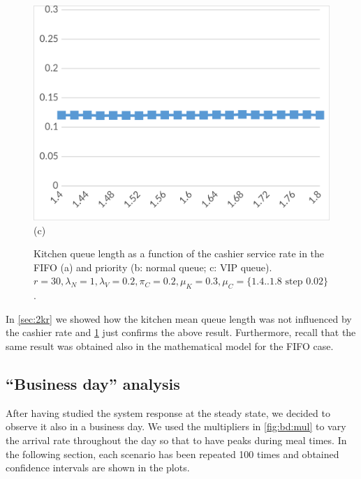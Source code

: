 \begin{figure}[H]
\begin{minipage}{0.32\textwidth}
    \includegraphics[width=\textwidth]{figs/inv_ql_vip.png}
    (c)
  \end{minipage}
  \caption{Kitchen queue length as a function of the cashier service rate in the FIFO (a) and priority (b: normal queue; c: VIP queue). 
  $r=30,\lambda_N=1,\lambda_V=0.2,\pi_C=0.2,\mu_K=0.3,\mu_C=\{1.4..1.8 \text{ step } 0.02\}$.}
  \label{fig:inv_ql}
\end{figure}

In \cref{sec:2kr} we showed how the kitchen mean queue length was not influenced by the cashier rate and \cref{fig:inv_ql} just confirms the above result. Furthermore, recall that the same result was obtained also in the mathematical model for the FIFO case.

\subsection{``Business day'' analysis}
After having studied the system response at the steady state, we decided to observe it also in a business day. We used the multipliers in \cref{fig:bd:mul} to vary the arrival rate throughout the day so that to have peaks during meal times. In the following section, each scenario has been repeated 100 times and obtained confidence intervals are shown in the plots.


